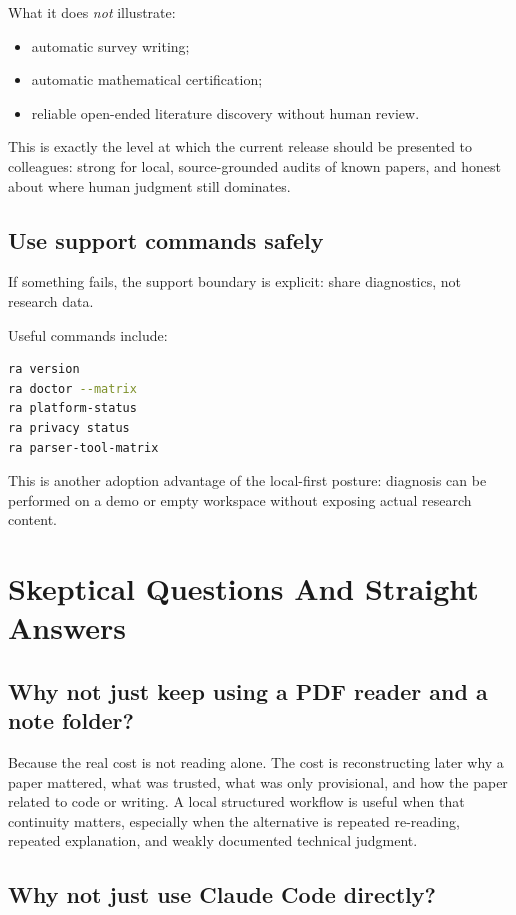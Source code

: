 \documentclass[11pt,a4paper,openany]{book}
\begin{document}
What it does \emph{not} illustrate:
\begin{itemize}[nosep]
  \item automatic survey writing;
  \item automatic mathematical certification;
  \item reliable open-ended literature discovery without human review.
\end{itemize}

This is exactly the level at which the current release should be presented to
colleagues: strong for local, source-grounded audits of known papers, and honest
about where human judgment still dominates.

\section{Use support commands safely}

If something fails, the support boundary is explicit: share diagnostics, not
research data.

Useful commands include:
\begin{lstlisting}[language=bash]
ra version
ra doctor --matrix
ra platform-status
ra privacy status
ra parser-tool-matrix
\end{lstlisting}

This is another adoption advantage of the local-first posture: diagnosis can be
performed on a demo or empty workspace without exposing actual research content.

\chapter{Skeptical Questions And Straight Answers}

\section{Why not just keep using a PDF reader and a note folder?}

Because the real cost is not reading alone. The cost is reconstructing later why
a paper mattered, what was trusted, what was only provisional, and how the paper
related to code or writing. A local structured workflow is useful when that
continuity matters, especially when the alternative is repeated re-reading,
repeated explanation, and weakly documented technical judgment.

\section{Why not just use Claude Code directly?}
\end{document}
